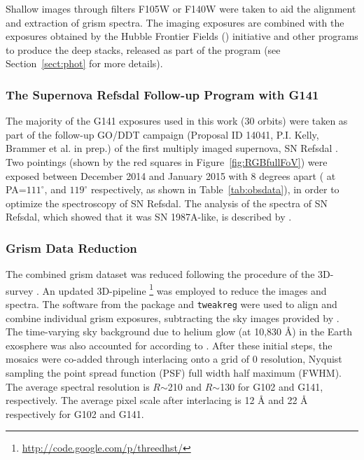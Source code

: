 Shallow images through filters F105W or F140W were taken to aid the
alignment and extraction of grism spectra. The imaging exposures are
combined with the exposures obtained by the Hubble Frontier
Fields (\hff) initiative and other programs to produce the deep
stacks, released as part of the \hff program (see Section~\ref{sect:phot}
for more details).

\subsubsection{The Supernova Refsdal Follow-up Program with \protect\hst G141}\label{subsect:refsdal}

The majority of the G141 exposures used in this work (30 orbits) were taken as part of the follow-up \hst GO/DDT
campaign (Proposal ID 14041, P.I. Kelly, Brammer et al. in prep.) of the first multiply
imaged supernova, SN Refsdal \citep{2015Sci...347.1123K}. Two pointings
(shown by the red squares in Figure~\ref{fig:RGBfullFoV}) were exposed between December 2014 and January 2015 with 8 degrees apart
(\ie
at PA=$111^{\circ}$, and $119^{\circ}$ respectively, as shown in Table~\ref{tab:obsdata}), in order to optimize the spectroscopy
of SN Refsdal.  The analysis of the
spectra of SN Refsdal, which showed that it was SN 1987A-like, is described by \citet{2015arXiv151209093K}.

\subsubsection{Grism Data Reduction}

The combined grism dataset was reduced following the procedure of the
3D-\hst survey \citep{Brammer:2012bu,Momcheva:2016fr}. An updated
3D-\hst pipeline \footnote{\url{http://code.google.com/p/threedhst/}}
was employed to reduce the images and spectra. The \adriz software
from the \dpac package and \verb+tweakreg+ were used to align and
combine individual grism exposures, subtracting the sky images
provided by \citet{Brammer:2012bu}. The time-varying sky background
due to helium glow (at 10,830 \AA) in the Earth exosphere was also
accounted for according to \citet{Brammer:2014wl}. After these initial
steps, the mosaics were co-added through interlacing onto a grid of
0 resolution, Nyquist sampling the point spread function (PSF)
full width half maximum (FWHM).  The average spectral resolution is $R$$\sim$210
and $R$$\sim$130 for G102 and G141, respectively. The average pixel scale
after interlacing is 12 \AA{} and 22 \AA{} respectively for G102 and G141.

